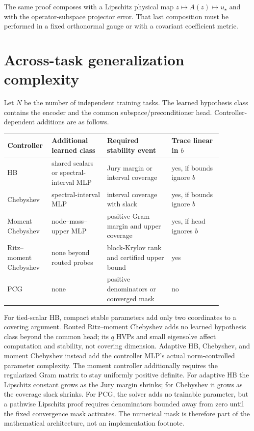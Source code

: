 \documentclass[11pt]{article}
\begin{document}
The same proof composes with a Lipschitz physical map
$z\mapsto A(z)\mapsto u_\star$ and with the operator-subspace projector error.
That last composition must be performed in a fixed orthonormal gauge or with a
covariant coefficient metric.

\section{Across-task generalization complexity}

Let $N$ be the number of independent training tasks.  The learned hypothesis
class contains the encoder and the common subspace/preconditioner head.
Controller-dependent additions are as follows.

\begin{center}
\begin{tabular}{p{0.13\linewidth}p{0.24\linewidth}p{0.28\linewidth}p{0.22\linewidth}}
\toprule
Controller & Additional learned class & Required stability event & Trace linear in $b$\\
\midrule
HB & shared scalars or spectral-interval MLP & Jury margin or interval coverage & yes, if bounds ignore $b$\\
Chebyshev & spectral-interval MLP & interval coverage with slack & yes, if bounds ignore $b$\\
Moment Chebyshev & node--mass--upper MLP & positive Gram margin and upper coverage & yes, if head ignores $b$\\
Ritz--moment Chebyshev & none beyond routed probes & block-Krylov rank and certified upper bound & yes\\
PCG & none & positive denominators or converged mask & no\\
\bottomrule
\end{tabular}
\end{center}

For tied-scalar HB, compact stable parameters add only two coordinates to a
covering argument.  Routed Ritz--moment Chebyshev adds no learned hypothesis
class beyond the common head; its \(q\) HVPs and small eigensolve affect
computation and stability, not covering dimension.  Adaptive HB, Chebyshev,
and moment Chebyshev instead add
the controller MLP's actual norm-controlled parameter complexity.  The
moment controller additionally requires the regularized Gram matrix to stay
uniformly positive definite.  For adaptive HB the Lipschitz
constant grows as the Jury margin shrinks; for Chebyshev it grows as the
coverage slack shrinks.  For PCG, the solver adds no trainable parameter, but a pathwise
Lipschitz proof requires denominators bounded away from zero until the fixed
convergence mask activates.  The numerical mask is therefore part of the
mathematical architecture, not an implementation footnote.
\end{document}
